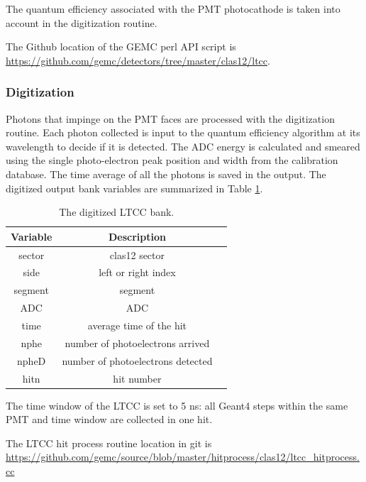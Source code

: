 The quantum efficiency associated with the PMT photocathode is taken into account in
the digitization routine.

The Github location of the GEMC perl API script is  \url{https://github.com/gemc/detectors/tree/master/clas12/ltcc}.


\subsubsection{Digitization}

Photons that impinge on the PMT faces are processed with the digitization routine.
Each photon collected is input to the quantum efficiency algorithm at its wavelength to decide if it is detected.
The ADC energy is calculated and smeared using the single photo-electron peak position and width from the calibration database.
The time average of all the photons is saved in the output.
The digitized output bank variables are summarized in Table \ref{tab:ltccBank}.

\begin{table}[h]
	\begin{center}
		\begin{tabular}{| c | c | c |}
			\hline \hline
			Variable & Description                                         \\
			\hline
             sector  &                                     clas12 sector   \\
               side  &                               left or right index   \\
            segment  &                                           segment   \\
                ADC  &                                               ADC   \\
               time  &                           average time of the hit   \\
               nphe  &                  number of photoelectrons arrived   \\
              npheD  &                 number of photoelectrons detected   \\
               hitn  &                                        hit number   \\
			\hline \hline
		\end{tabular}
	\end{center}
	\caption{The digitized LTCC bank.}\label{tab:ltccBank}
\end{table}

The time window  of the LTCC is set to 5 ns: all Geant4 steps within the same PMT and time window are collected in one hit.

The LTCC hit process routine location in git is \url{https://github.com/gemc/source/blob/master/hitprocess/clas12/ltcc_hitprocess.cc}
